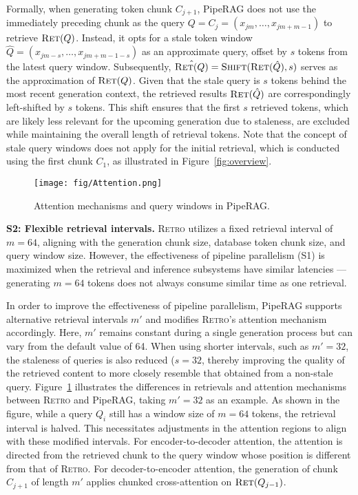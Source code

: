 Formally, when generating token chunk \( C_{j+1} \), PipeRAG does not use the immediately preceding chunk as the query \( Q = C_j = (x_{jm}, \ldots, x_{jm + m - 1}) \) to retrieve \( \textsc{Ret}(Q) \). Instead, it opts for a stale token window \( \hat{Q} = (x_{jm - s}, \ldots, x_{jm + m - 1 - s}) \) as an approximate query, offset by \( s \) tokens from the latest query window. Subsequently, \( \hat{\textsc{Ret}(Q)} = \textsc{Shift}(\textsc{Ret}(\hat{Q}), s) \) serves as the approximation of \( \textsc{Ret}(Q) \). Given that the stale query is \( s \) tokens behind the most recent generation context, the retrieved results \( \textsc{Ret}(\hat{Q}) \) are correspondingly left-shifted by \( s \) tokens. This shift ensures that the first \( s \) retrieved tokens, which are likely less relevant for the upcoming generation due to staleness, are excluded while maintaining the overall length of retrieval tokens. Note that the concept of stale query windows does not apply for the initial retrieval, which is conducted using the first chunk \( C_{1} \), as illustrated in Figure~\ref{fig:overview}.

\begin{figure}[t]
	\centering
  \texttt{[image: fig/Attention.png]}
  \vspace{-2em}
  \caption{Attention mechanisms and query windows in PipeRAG.}
  \vspace{-1em}
  \label{fig:attention}
\end{figure}

\textbf{S2: Flexible retrieval intervals.} 
\textsc{Retro} utilizes a fixed retrieval interval of \( m=64 \), aligning with the generation chunk size, database token chunk size, and query window size. 
However, the effectiveness of pipeline parallelism (S1) is maximized when the retrieval and inference subsystems have similar latencies --- generating \( m=64 \) tokens does not always consume similar time as one retrieval. 

In order to improve the effectiveness of pipeline parallelism, PipeRAG supports alternative retrieval intervals \( m' \) and modifies \textsc{Retro}'s attention mechanism accordingly.
Here, \( m' \) remains constant during a single generation process but can vary from the default value of 64. When using shorter intervals, such as \( m'=32 \), the staleness of queries is also reduced (\( s=32 \), thereby improving the quality of the retrieved content to more closely resemble that obtained from a non-stale query.
Figure~\ref{fig:attention} illustrates the differences in retrievals and attention mechanisms between \textsc{Retro} and PipeRAG, taking \( m'=32 \) as an example. As shown in the figure, while a query \( Q_i \) still has a window size of \( m=64 \) tokens, the retrieval interval is halved. This necessitates adjustments in the attention regions to align with these modified intervals. For encoder-to-decoder attention, the attention is directed from the retrieved chunk to the query window whose position is different from that of \textsc{Retro}. For decoder-to-encoder attention, the generation of chunk \( C_{j+1} \) of length \( m' \) applies chunked cross-attention on \( \textsc{Ret}(Q_{j-1}) \).

